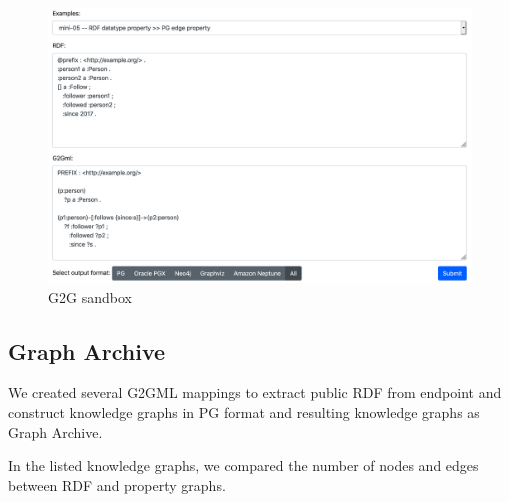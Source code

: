 \documentclass[runningheads]{llncs}
\begin{document}
\begin{figure}
\center
\includegraphics[width=1.0\textwidth]{sandbox.png}
\caption{G2G sandbox}
\label{fig:sandbox}
\end{figure}

\subsection{Graph Archive}
We created several G2GML mappings to extract public RDF from endpoint and construct knowledge graphs in PG format and resulting knowledge graphs as Graph Archive.

In the listed knowledge graphs, we compared the number of nodes and edges between RDF and property graphs.

\end{document}

